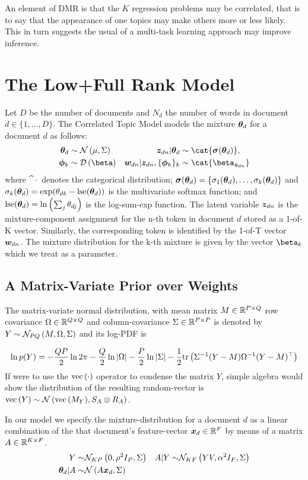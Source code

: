 An element of DMR is that the $K$ regression problems may be correlated, that is to say that the appearance of one topics may make others more or less likely. This in turn suggests the usual of a multi-task learning approach may improve inference.

\section{The Low+Full Rank Model}
Let $D$ be the number of documents and $N_d$ the number of words in document $d\in\{1,\ldots,D\}$. The Correlated Topic Model models the mixture ${ \bm \theta_d }$ for a document $d$ as follows:
\begin{align}
\thd &\sim \nor{\mu}{\Sigma}
&\zdn | \thd &\sim \cat {\vv{\sigma}(\thd)} ,\\
\pk &\sim\dir{\vv{\beta}}
&\wdn | \zdn , \{\pk\}_k &\sim \cat{\vv{\beta}_{\zdn}}
\end{align}
where $\cat{\cdot}$ denotes the categorical distribution; $\bm \sigma({ \bm \theta_d }) = \{\sigma_1({ \bm \theta_d }), \ldots, \sigma_k({ \bm \theta_d })\}$ and $\sigma_k({ \bm \theta_d }) = \exp({ \theta_{dk} } - \text{lse}({ \bm \theta_d }))$ is the multivariate softmax function; and $\text{lse}({ \bm \theta_d }) = \ln\left(\sum_j { \theta_{dj} } \right)$ is the log-sum-exp function. The latent variable ${ \bm z_{dn} }$ is the mixture-component assignment for the n-th token in document $d$ stored as a 1-of-K vector. Similarly, the corresponding token is identified by the 1-of-T vector ${ \bm w_{dn} }$. The mixture distribution for the k-th mixture is given by the vector $\vv{\beta}_k$ which we treat as a parameter.

\subsection{A Matrix-Variate Prior over Weights}
The matrix-variate normal distribution, with mean matrix $M \in { \mathbb{R}^{P \times Q} }$ row covariance $\Omega \in { \mathbb{R}^{Q \times Q} }$ and column-covariance $\Sigma \in { \mathbb{R}^{P \times P} }$ is denoted by $Y \sim \mathcal{N}_{{PQ}} \left(M, \Omega, \Sigma\right)$ and its log-PDF is

\begin{align}
\ln p(Y) = 
-\frac{QP}{2} \ln 2\pi
-\frac{Q}{2}\ln |\Omega|
-\frac{P}{2}\ln |\Sigma|
-\frac{1}{2}
\text{tr} \left( {
    {\Sigma}^{-1}(Y - M){\Omega}^{-1}(Y - M)^\top
} \right)
\end{align}
If were to use the $\text{vec}\left(\cdot\right)$ operator to condense the matrix $Y$, simple algebra would show the distribution of the resulting random-vector is $\text{vec}\left(Y\right) \sim \mathcal{N} \left( {\text{vec}\left(M_Y\right)}, {S_A \otimes R_A} \right)$.

In our model we specify the mixture-distribution for a document $d$ as a linear combination of the that document's feature-vector ${ \bm x_d } \in { \mathbb{R}^{F} }$ by means of a matrix $A \in { \mathbb{R}^{K \times F} }$.
\begin{align}
Y \sim & \mathcal{N}_{{KP}} \left(0, \rho^2 I_P, \Sigma\right) & A|Y \sim & \mathcal{N}_{{KF}} \left(YV, \alpha^2 I_F, \Sigma\right) \\
{ \bm \theta_d } | A \sim & \mathcal{N} \left( {A\bm x_d}, {\Sigma} \right)
\end{align}

